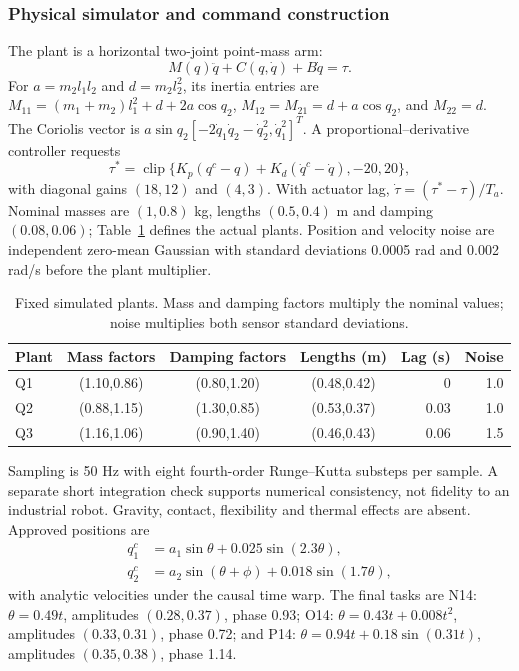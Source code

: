\subsubsection{Physical simulator and command construction}
The plant is a horizontal two-joint point-mass arm:
\begin{equation}
 M(q)\ddot q+C(q,\dot q)+B\dot q=\tau.\label{eq:plant}
\end{equation}
For $a=m_2l_1l_2$ and $d=m_2l_2^2$, its inertia entries are $M_{11}=(m_1+m_2)l_1^2+d+2a\cos q_2$, $M_{12}=M_{21}=d+a\cos q_2$, and $M_{22}=d$. The Coriolis vector is $a\sin q_2[-2\dot q_1\dot q_2-\dot q_2^2,\dot q_1^2]^T$. A proportional--derivative controller requests
\begin{equation}
 \tau^*=\operatorname{clip}\{K_p(q^c-q)+K_d(\dot q^c-\dot q),-20,20\},
\end{equation}
with diagonal gains $(18,12)$ and $(4,3)$. With actuator lag, $\dot\tau=(\tau^*-\tau)/T_a$. Nominal masses are $(1,0.8)$ kg, lengths $(0.5,0.4)$ m and damping $(0.08,0.06)$; Table~\ref{tab:plants} defines the actual plants. Position and velocity noise are independent zero-mean Gaussian with standard deviations 0.0005 rad and 0.002 rad/s before the plant multiplier.

\begin{table}[t]\centering
\caption{Fixed simulated plants. Mass and damping factors multiply the nominal values; noise multiplies both sensor standard deviations.}\label{tab:plants}
\begin{tabular}{lcccrr}\toprule
Plant & Mass factors & Damping factors & Lengths (m) & Lag (s) & Noise\\\midrule
Q1 & (1.10,0.86) & (0.80,1.20) & (0.48,0.42) & 0 & 1.0\\
Q2 & (0.88,1.15) & (1.30,0.85) & (0.53,0.37) & 0.03 & 1.0\\
Q3 & (1.16,1.06) & (0.90,1.40) & (0.46,0.43) & 0.06 & 1.5\\\bottomrule
\end{tabular}
\end{table}

Sampling is 50 Hz with eight fourth-order Runge--Kutta substeps per sample. A separate short integration check supports numerical consistency, not fidelity to an industrial robot. Gravity, contact, flexibility and thermal effects are absent. Approved positions are
\begin{align}
 q_1^c&=a_1\sin\theta+0.025\sin(2.3\theta),\\
 q_2^c&=a_2\sin(\theta+\phi)+0.018\sin(1.7\theta),
\end{align}
with analytic velocities under the causal time warp. The final tasks are N14: $\theta=0.49t$, amplitudes $(0.28,0.37)$, phase 0.93; O14: $\theta=0.43t+0.008t^2$, amplitudes $(0.33,0.31)$, phase 0.72; and P14: $\theta=0.94t+0.18\sin(0.31t)$, amplitudes $(0.35,0.38)$, phase 1.14.

